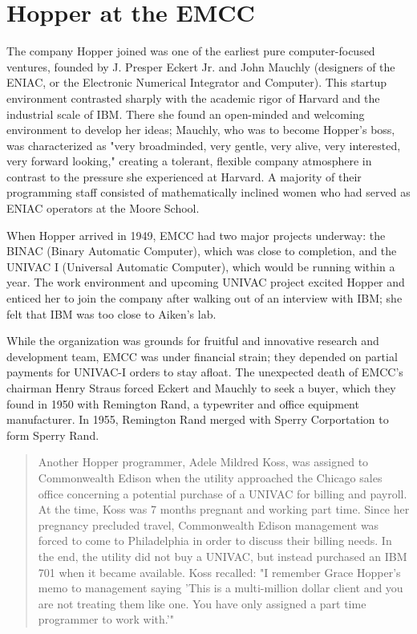 \section{Hopper at the EMCC}

The company Hopper joined was one of the earliest pure computer-focused ventures,
founded by J. Presper Eckert Jr. and John Mauchly
(designers of the ENIAC, or the Electronic Numerical Integrator and Computer).
This startup environment contrasted sharply with the academic rigor of Harvard and the industrial scale of IBM.
There she found an open-minded and welcoming environment to develop her ideas;
Mauchly, who was to become Hopper's boss, was characterized as 
"very broadminded, very gentle, very alive, very interested, very forward looking,"
\cite{grace_hopper_and_the_invention_of_the_information_age_2009}
creating a tolerant, flexible company atmosphere in contrast to the pressure she experienced at Harvard.
A majority of their programming staff consisted of mathematically inclined women
who had served as ENIAC operators at the Moore School.

When Hopper arrived in 1949, EMCC had two major projects underway:
the BINAC (Binary Automatic Computer), which was close to completion,
and the UNIVAC I (Universal Automatic Computer), which would be running within a year.
The work environment and upcoming UNIVAC project excited Hopper and enticed her to join the company
after walking out of an interview with IBM; she felt that IBM was too close
to Aiken's lab.

While the organization was grounds for fruitful and innovative research and development team,
EMCC was under financial strain; they depended on partial payments for UNIVAC-I orders to stay afloat.
The unexpected death of EMCC's chairman Henry Straus forced Eckert and Mauchly to seek a buyer,
which they found in 1950 with Remington Rand, a typewriter and office equipment manufacturer.
In 1955, Remington Rand merged with Sperry Corportation to form Sperry Rand.

\begin{quotation}
Another Hopper programmer, Adele Mildred Koss, was
assigned to Commonwealth Edison when the utility approached
the Chicago sales office concerning a potential purchase of a
UNIVAC for billing and payroll. At the time, Koss was 7 months
pregnant and working part time. Since her pregnancy precluded
travel, Commonwealth Edison management was forced to come
to Philadelphia in order to discuss their billing needs. In the end,
the utility did not buy a UNIVAC, but instead purchased an IBM
701 when it became available. Koss recalled: "I remember Grace
Hopper's memo to management saying 'This is a multi-million
dollar client and you are not treating them like one. You have
only assigned a part time programmer to work with.'"
\cite[Adele Mildred Koss, interviewed by Kathy Kleiman]{grace_hopper_and_the_invention_of_the_information_age_2009}
\end{quotation}

